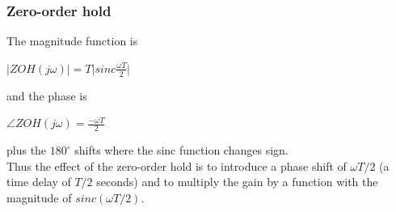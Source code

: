 \begin{frame}
	\frametitle{Zero-order hold}
	The magnitude function is\\
	\vspace{-1ex}
	\begin{center}
		$|ZOH(j\omega)| = T\Big|sinc\frac{\omega T}{2} \Big|$
	\end{center}
	\vspace{-1ex}
	and the phase is\\
	\vspace{-1ex}
	\begin{center}
		$\angle ZOH(j\omega)=\frac{-\omega T}{2}$
	\end{center}
	\vspace{-1ex}
	plus the $180^\circ$ shifts where the sinc function changes sign.\\
	\medskip
	Thus the effect of the zero-order hold is to introduce a phase shift of $\omega T/2$ (a time delay of $T/2$ seconds) and to multiply the gain by a function with the magnitude of $sinc(\omega T/2)$.
\end{frame}

